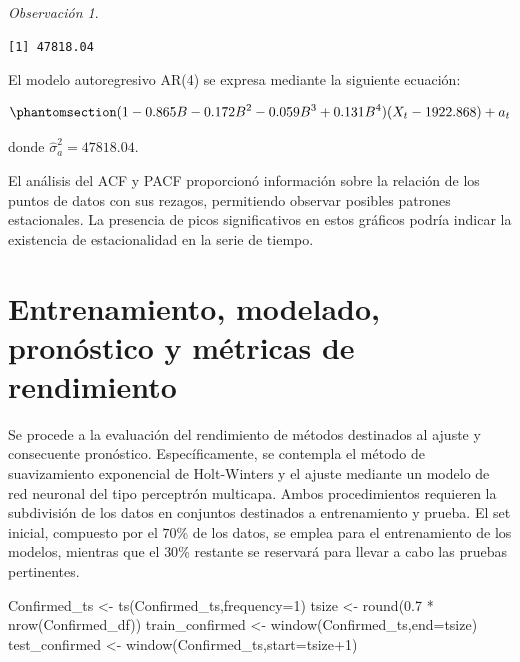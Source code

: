 \documentclass[
  us-letterpaper,
]{scrreprt}
\newenvironment{Shaded}{\begin{snugshade}}{\end{snugshade}}
\newcommand{\AttributeTok}[1]{\textcolor[rgb]{0.40,0.45,0.13}{#1}}
\newcommand{\CommentTok}[1]{\textcolor[rgb]{0.37,0.37,0.37}{#1}}
\newcommand{\DecValTok}[1]{\textcolor[rgb]{0.68,0.00,0.00}{#1}}
\newcommand{\FloatTok}[1]{\textcolor[rgb]{0.68,0.00,0.00}{#1}}
\newcommand{\FunctionTok}[1]{\textcolor[rgb]{0.28,0.35,0.67}{#1}}
\newcommand{\NormalTok}[1]{\textcolor[rgb]{0.00,0.23,0.31}{#1}}
\newcommand{\OtherTok}[1]{\textcolor[rgb]{0.00,0.23,0.31}{#1}}
\newcommand{\SpecialCharTok}[1]{\textcolor[rgb]{0.37,0.37,0.37}{#1}}
\theoremstyle{plain}
\theoremstyle{definition}
\theoremstyle{plain}
\theoremstyle{definition}
\theoremstyle{remark}
\newtheorem*{remark}{Observación}
\begin{document}
\begin{remark}
\begin{Shaded}
\end{Shaded}

\begin{verbatim}
[1] 47818.04
\end{verbatim}

El modelo autoregresivo AR(4) se expresa mediante la siguiente ecuación:

\begin{equation}\phantomsection\label{eq-AR4}{
(1-0.865B-0.172B^2-0.059B^3+0.131B^4)(X_t-1922.868)+a_t
}\end{equation}

donde \(\hat{\sigma}_a^2 = 47818.04\).
\end{remark}

El análisis del ACF y PACF proporcionó información sobre la relación de
los puntos de datos con sus rezagos, permitiendo observar posibles
patrones estacionales. La presencia de picos significativos en estos
gráficos podría indicar la existencia de estacionalidad en la serie de
tiempo.

\section{Entrenamiento, modelado, pronóstico y métricas de
rendimiento}\label{entrenamiento-modelado-pronuxf3stico-y-muxe9tricas-de-rendimiento}

Se procede a la evaluación del rendimiento de métodos destinados al
ajuste y consecuente pronóstico. Específicamente, se contempla el método
de suavizamiento exponencial de Holt-Winters y el ajuste mediante un
modelo de red neuronal del tipo perceptrón multicapa. Ambos
procedimientos requieren la subdivisión de los datos en conjuntos
destinados a entrenamiento y prueba. El set inicial, compuesto por el
\(70\%\) de los datos, se emplea para el entrenamiento de los modelos,
mientras que el \(30\%\) restante se reservará para llevar a cabo las
pruebas pertinentes.

\begin{Shaded}
\begin{Highlighting}[]
\NormalTok{Confirmed\_ts }\OtherTok{\textless{}{-}} \FunctionTok{ts}\NormalTok{(Confirmed\_ts,}\AttributeTok{frequency=}\DecValTok{1}\NormalTok{)}
\NormalTok{tsize }\OtherTok{\textless{}{-}} \FunctionTok{round}\NormalTok{(}\FloatTok{0.7} \SpecialCharTok{*} \FunctionTok{nrow}\NormalTok{(Confirmed\_df))}
\NormalTok{train\_confirmed }\OtherTok{\textless{}{-}} \FunctionTok{window}\NormalTok{(Confirmed\_ts,}\AttributeTok{end=}\NormalTok{tsize)}
\NormalTok{test\_confirmed }\OtherTok{\textless{}{-}} \FunctionTok{window}\NormalTok{(Confirmed\_ts,}\AttributeTok{start=}\NormalTok{tsize}\SpecialCharTok{+}\DecValTok{1}\NormalTok{)}
\end{Highlighting}
\end{Shaded}
\end{document}
